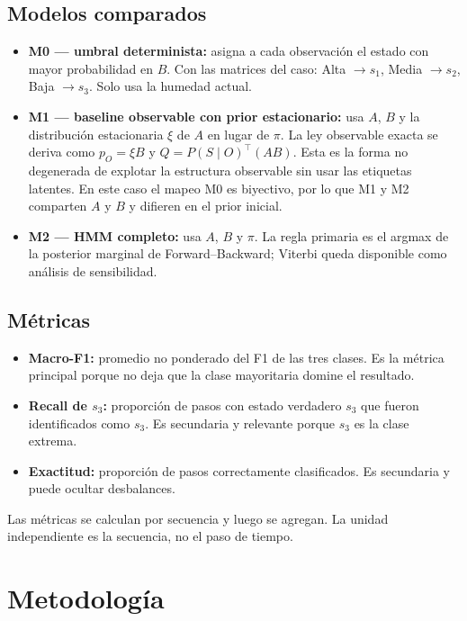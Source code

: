 \documentclass[11pt,a4paper]{article}
\begin{document}
\subsection{Modelos comparados}

\begin{itemize}
  \item \textbf{M0 --- umbral determinista:} asigna a cada observación el estado con mayor probabilidad en \(B\). Con las matrices del caso: Alta \(\rightarrow s_1\), Media \(\rightarrow s_2\), Baja \(\rightarrow s_3\). Solo usa la humedad actual.
  \item \textbf{M1 --- baseline observable con prior estacionario:} usa \(A\), \(B\) y la distribución estacionaria \(\xi\) de \(A\) en lugar de \(\pi\). La ley observable exacta se deriva como \(p_O=\xi B\) y \(Q=P(S\mid O)^{\top}(AB)\). Esta es la forma no degenerada de explotar la estructura observable sin usar las etiquetas latentes. En este caso el mapeo M0 es biyectivo, por lo que M1 y M2 comparten \(A\) y \(B\) y difieren en el prior inicial.
  \item \textbf{M2 --- HMM completo:} usa \(A\), \(B\) y \(\pi\). La regla primaria es el argmax de la posterior marginal de Forward--Backward; Viterbi queda disponible como análisis de sensibilidad.
\end{itemize}

\subsection{Métricas}

\begin{itemize}
  \item \textbf{Macro-F1:} promedio no ponderado del F1 de las tres clases. Es la métrica principal porque no deja que la clase mayoritaria domine el resultado.
  \item \textbf{Recall de \(s_3\):} proporción de pasos con estado verdadero \(s_3\) que fueron identificados como \(s_3\). Es secundaria y relevante porque \(s_3\) es la clase extrema.
  \item \textbf{Exactitud:} proporción de pasos correctamente clasificados. Es secundaria y puede ocultar desbalances.
\end{itemize}

Las métricas se calculan por secuencia y luego se agregan. La unidad independiente es la secuencia, no el paso de tiempo.

\section{Metodología}
\end{document}
